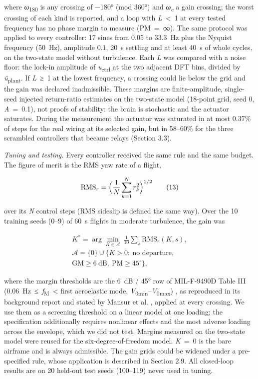 \documentclass[11pt,letterpaper]{article}
\begin{document}
\noindent where \emph{ω}\textsubscript{180} is any crossing of −180°
(mod 360°) and \emph{ω\textsubscript{c}} a gain crossing; the worst
crossing of each kind is reported, and a loop with
\textbar{}\emph{L}\textbar~\textless~1 at every tested frequency has no
phase margin to measure (PM~=~∞). The same protocol was applied to every
controller: 17 sines from 0.05 to 33.3~Hz plus the Nyquist frequency
(50~Hz), amplitude 0.1, 20~s settling and at least 40~s of whole cycles,
on the two-state model without turbulence. Each
\textbar{}\emph{L}\textbar{} was compared with a noise floor: the
lock-in amplitude of \emph{u}\textsubscript{ctrl} at the two adjacent
DFT bins, divided by \textbar{}\emph{û}\textsubscript{plant}\textbar. If
\textbar{}\emph{L}\textbar~≥~1 at the lowest frequency, a crossing could
lie below the grid and the gain was declared inadmissible. These margins
are finite-amplitude, single-seed injected return-ratio estimates on the
two-state model (18-point grid, seed 0, \emph{A}~=~0.1), not proofs of
stability: the brain is stochastic and the actuator saturates. During
the measurement the actuator was saturated in at most 0.37\% of steps
for the real wiring at its selected gain, but in 58--60\% for the three
scrambled controllers that became relays (Section 3.3).

\emph{Tuning and testing.} Every controller received the same rule and
the same budget. The figure of merit is the RMS yaw rate of a flight,

\[\mathrm{RMS}_r=\Bigl(\frac{1}{N}\sum_{k=1}^{N}r_k^2\Bigr)^{1/2}\tag{13}\]

\noindent over its \emph{N} control steps (RMS sideslip is defined the
same way). Over the 10 training seeds (0--9) of 60~s flights in moderate
turbulence, the gain was

\[\begin{gathered}K^{\ast}=\arg\min_{K\in\mathcal{A}}\ \frac{1}{10}\sum_{s}\mathrm{RMS}_r(K,s),\\ \mathcal{A}=\{0\}\cup\bigl\{K>0:\ \text{no departure},\\ \mathrm{GM}\ge 6\ \mathrm{dB},\ \mathrm{PM}\ge 45^\circ\bigr\},\end{gathered}\tag{14}\]

\noindent where the margin thresholds are the 6~dB / 45° row of
MIL-F-9490D Table III (0.06~Hz~≤~\emph{f}\textsubscript{M}~\textless{}
first aeroelastic mode,
\emph{V}\textsubscript{0min}--\emph{V}\textsubscript{0max})
\cite{milf94901975}, as reproduced in its background report
\cite{boeing94901975} and stated by Mansur et al. \cite{mansur2009},
applied at every crossing. We use them as a screening threshold on a
linear model at one loading; the specification additionally requires
nonlinear effects and the most adverse loading across the envelope,
which we did not test. Margins measured on the two-state model were
reused for the six-degree-of-freedom model. \emph{K}~=~0 is the bare
airframe and is always admissible. The gain grids could be widened under
a pre-specified rule, whose application is described in Section 2.9. All
closed-loop results are on 20 held-out test seeds (100--119) never used
in tuning.
\end{document}
